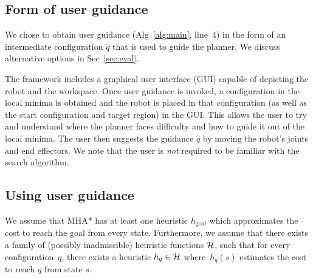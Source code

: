 \documentclass[conference]{IEEEtran}
\begin{document}
%
%
%
%

\subsection{Form of user guidance}
\label{sec:q2}
We chose to obtain user guidance 
(Alg~\ref{alg:main}, line~4)
in the form of an intermediate configuration $\hat{q}$ that is used to guide the planner. We discuss alternative options in Sec~\ref{sec:eval}.

The framework includes a graphical user interface (GUI)
 capable of  depicting the robot and the workspace.
Once user guidance is invoked, 
a configuration in the local minima is obtained and the robot is placed in that configuration (as well as the start configuration and target region) in the GUI.
This allows the user to try and understand where the planner faces difficulty and how to guide it out of the local minima.
The user then suggests the guidance $\hat{q}$ by moving the robot's joints and end effectors.
We note that the user is \emph{not} required to be familiar with the search algorithm.

\subsection{Using user guidance}
\label{sec:q3}


We assume that MHA* has at least one heuristic $h_{\text{goal}}$ which approximates the cost to reach the goal from every state.
Furthermore, we assume that there exists a family of (possibly inadmissible) heuristic functions $\mathcal{H}$, such that for every configuration~$q$, there exists a heuristic $h_q \in \mathcal{H}$ where~$h_q(s)$ estimates the cost to reach $q$ from state $s$.
\end{document}
